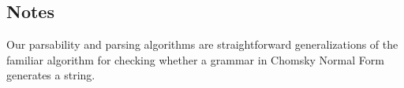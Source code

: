 \subsection{Notes}

Our parsability and parsing algorithms are straightforward generalizations of
the familiar algorithm for checking whether a grammar in Chomsky Normal Form
generates a string.

